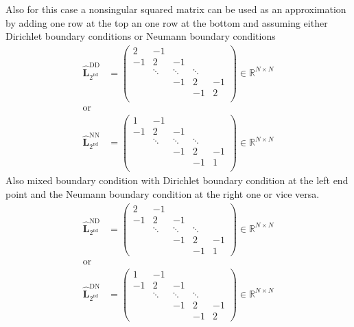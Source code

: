 Also for this case a nonsingular squared matrix can be used as an approximation by adding one row at the top an one row at the bottom and assuming either Dirichlet boundary conditions or Neumann boundary conditions
\begin{align}\label{eq:second_derivative_penalty_plus_DrichletNeumann}
   \hat{\mathbf{L}}_\mathrm{2^{nd}}^\mathrm{DD} &=
  \begin{pmatrix}
    2   & -1     &        &        &    \\
    -1  & 2      & -1     &        &    \\
        & \ddots & \ddots & \ddots &    \\
        &        &  -1    & 2      & -1 \\
        &        &        & -1     & 2  \\
  \end{pmatrix}  \in \mathbb{R}^{N\times N}\\
  \mbox{or}  \nonumber \\
  \hat{\mathbf{L}}_\mathrm{2^{nd}}^\mathrm{NN}  &=
  \begin{pmatrix}
     1  & -1     &        &        &  \\
    -1  & 2      & -1     &        &  \\
        & \ddots & \ddots & \ddots &  \\
        &        & -1     &  2     & -1 \\
        &        &        & -1     & 1  \\
  \end{pmatrix} \in \mathbb{R}^{N\times N}
\end{align}
Also mixed boundary condition with Dirichlet boundary condition at the left end point and the Neumann boundary condition at the
right one or  vice versa.
\begin{align}\label{eq:second_derivative_penalty_plus_mixedDrichletNeumann}
  \hat{\mathbf{L}}_\mathrm{2^{nd}}^\mathrm{ND}  &=
  \begin{pmatrix}
    2   & -1     &        &        &    \\
    -1  & 2      & -1     &        &    \\
        & \ddots & \ddots & \ddots &    \\
        &        & -1     &  2     & -1 \\
        &        &        & -1     &  1
  \end{pmatrix} \in \mathbb{R}^{N\times N} \\
  \mbox{or}  \nonumber\\
   \hat{\mathbf{L}}_\mathrm{2^{nd}}^\mathrm{DN} &=
  \begin{pmatrix}
     1  & -1     &        &        &    \\
    -1  & 2      &  -1    &        &    \\
        & \ddots & \ddots & \ddots &    \\
        &        &  -1    &  2     & -1 \\
        &        &        & -1     & 2
  \end{pmatrix}  \in \mathbb{R}^{N\times N}
\end{align}

